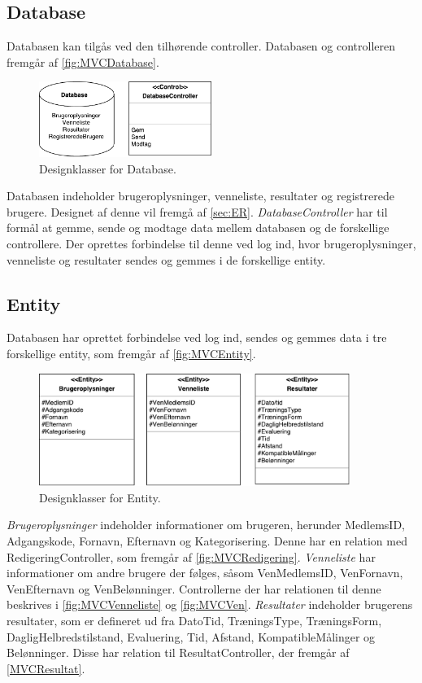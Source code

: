 \subsection{Database}
Databasen kan tilgås ved den tilhørende controller. Databasen og controlleren fremgår af \autoref{fig:MVCDatabase}. 

\begin{figure} [H]
\centering
\includegraphics[width=0.5\textwidth]{figures/MVC/MVCDatabase}
\caption{Designklasser for Database.}
\label{fig:MVCDatabase}
\end{figure}

\noindent
Databasen indeholder brugeroplysninger, venneliste, resultater og registrerede brugere. Designet af denne vil fremgå af \autoref{sec:ER}. \textit{DatabaseController} har til formål at gemme, sende og modtage data mellem databasen og de forskellige controllere. Der oprettes forbindelse til denne ved log ind, hvor brugeroplysninger, venneliste og resultater sendes og gemmes i de forskellige entity. 


\subsection{Entity}  
Databasen har oprettet forbindelse ved log ind, sendes og gemmes data i tre forskellige entity, som fremgår af \autoref{fig:MVCEntity}. 

\begin{figure} [H]
\centering
\includegraphics[width=0.9\textwidth]{figures/MVC/Entity}
\caption{Designklasser for Entity.}
\label{fig:MVCEntity}
\end{figure}

\noindent
\textit{Brugeroplysninger} indeholder informationer om brugeren, herunder MedlemsID, Adgangskode, Fornavn, Efternavn og Kategorisering. Denne har en relation med RedigeringController, som fremgår af \autoref{fig:MVCRedigering}. 
\textit{Venneliste} har informationer om andre brugere der følges, såsom VenMedlemsID, VenFornavn, VenEfternavn og VenBelønninger. Controllerne der har relationen til denne beskrives i \autoref{fig:MVCVenneliste} og  \autoref{fig:MVCVen}.
\textit{Resultater} indeholder brugerens resultater, som er defineret ud fra DatoTid, TræningsType, TræningsForm, DagligHelbredstilstand, Evaluering, Tid, Afstand, KompatibleMålinger og Belønninger. Disse har relation til ResultatController, der fremgår af  \autoref{MVCResultat}.


